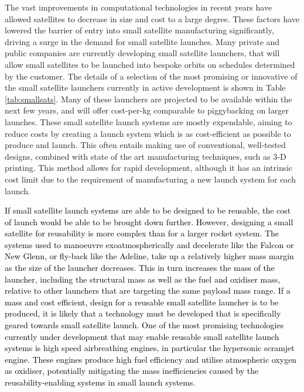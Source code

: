     
    The vast improvements in computational technologies in recent years have allowed satellites to decrease in size and cost to a large degree. These factors have lowered the barrier of entry into small satellite manufacturing significantly, driving a surge in the demand for small satellite launches. Many private and public companies are currently developing small satellite launchers, that will allow small satellites to be launched into bespoke orbits on schedules determined by the customer\cite{Faa2018}. The details of a selection of the most promising or innovative of the small satellite launchers currently in active development is shown in Table \ref{tab:smallsats}. Many of these launchers are projected to be available within the next few years, and will offer cost-per-kg comparable to piggybacking on larger launches.
    These small satellite launch systems are mostly expendable, aiming to reduce costs by creating a launch system which is as cost-efficient as possible to produce and launch\cite{Niederstrasser2015}. This often entails making use of conventional, well-tested designs, combined with state of the art manufacturing techniques, such as 3-D printing\cite{Niederstrasser2015,Gilmour}. This method allows for rapid development, although it has an intrinsic cost limit due to the requirement of manufacturing a new launch system for each launch. 
    
    \textcolor{black}{If small satellite launch systems are able to be designed to be reusable, the cost of launch would be able to be brought down further. However, designing a small satellite for reusability is more complex than for a larger rocket system. The systems used to manoeuvre exoatmospherically and decelerate like the Falcon or New Glenn, or fly-back like the Adeline, take up a relatively higher mass margin as the size of the launcher decreases. This in turn increases the mass of the launcher, including the structural mass as well as the fuel and oxidiser mass, relative to other launchers that are targeting the same payload mass range. If a mass and cost efficient, design for a reusable small satellite launcher is to be produced, it is likely that a technology must be developed that is specifically geared towards small satellite launch. 
    One of the most promising technologies currently under development that may enable reusable small satellite launch systems is high speed airbreathing engines\cite{Smart2009}, in particular the hypersonic scramjet engine. These engines produce high fuel efficiency and utilise atmospheric oxygen as oxidiser, potentially mitigating the mass inefficiencies caused by the reusability-enabling systems in small launch systems.}
    
